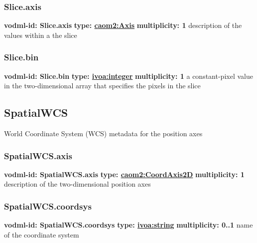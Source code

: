     \subsubsection{Slice.axis}
      \textbf{vodml-id: Slice.axis} \newline
      \textbf{type: \hyperref[sect:Axis]{caom2:Axis}} \newline
      \textbf{multiplicity: 1} \newline
      description of the values within a the slice

    \subsubsection{Slice.bin}
      \textbf{vodml-id: Slice.bin} \newline
      \textbf{type: \hyperref[sect:ivoa]{ivoa:integer}} \newline
      \textbf{multiplicity: 1} \newline
      a constant-pixel value in the two-dimensional array that specifies the pixels in the slice

  \subsection{SpatialWCS}
  \label{sect:SpatialWCS}
    World Coordinate System (WCS) metadata for the position axes

    \subsubsection{SpatialWCS.axis}
      \textbf{vodml-id: SpatialWCS.axis} \newline
      \textbf{type: \hyperref[sect:CoordAxis2D]{caom2:CoordAxis2D}} \newline
      \textbf{multiplicity: 1} \newline
      description of the two-dimensional position axes

    \subsubsection{SpatialWCS.coordsys}
      \textbf{vodml-id: SpatialWCS.coordsys} \newline
      \textbf{type: \hyperref[sect:ivoa]{ivoa:string}} \newline
      \textbf{multiplicity: 0..1} \newline
      name of the coordinate system

